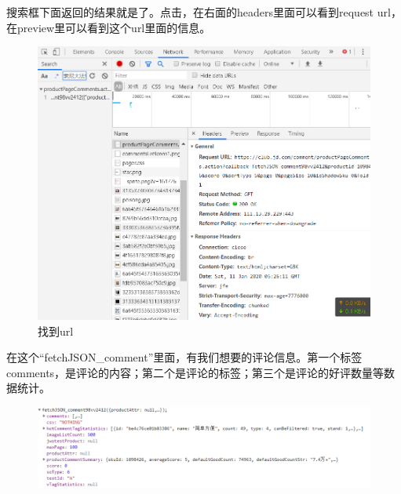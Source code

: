 搜索框下面返回的结果就是了。点击，在右面的headers里面可以看到request url，在preview里可以看到这个url里面的信息。
\begin{figure}[htbp]
\centering
\includegraphics[width=13.5cm]{find url jd.png}
\caption{找到url} %
\end{figure}

在这个“fetchJSON\_comment”里面，有我们想要的评论信息。第一个标签comments，是评论的内容；第二个是评论的标签；第三个是评论的好评数量等数据统计。
\begin{figure}[htbp]
\centering
\includegraphics[width=13.5cm]{json items jd.png}
\end{figure}



